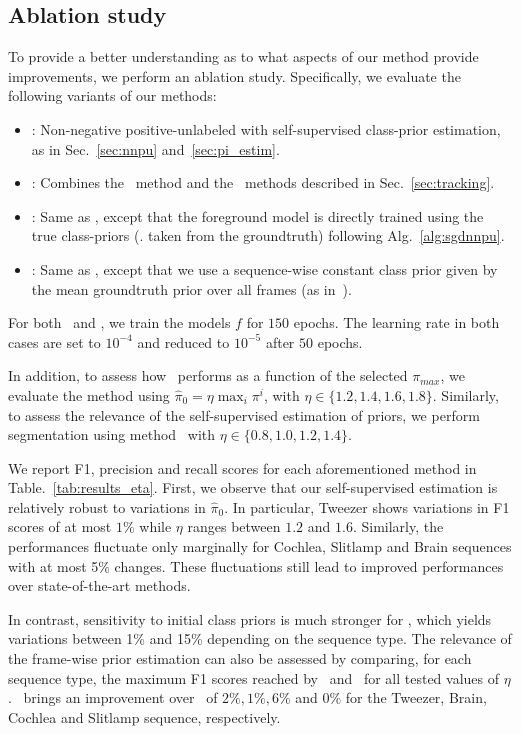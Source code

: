 \subsection{Ablation study}
\label{sec:ablation}
To provide a better understanding as to what aspects of our method provide improvements, we perform an ablation study. Specifically, we evaluate the following variants of our methods:
\begin{itemize}
\item \SSnnPU: Non-negative positive-unlabeled with self-supervised class-prior estimation, as in Sec.~\ref{sec:nnpu} and~\ref{sec:pi_estim}.
\item \SSnnPUKSP: Combines the \SSnnPU~method and the \KSPTrack~methods described in Sec.~\ref{sec:tracking}.
\item \SSnnPUTrue: Same as \SSnnPUKSP, except that the foreground model is directly trained using the true class-priors (\ie. taken from the groundtruth) following Alg.~\ref{alg:sgdnnpu}.
\item \SSnnPUConst: Same as \SSnnPUTrue, except that we use a sequence-wise constant class prior given by the mean groundtruth prior over all frames (as in~\cite{kiryo17}).
\end{itemize}
For both \SSnnPUTrue~and \SSnnPUConst, we train the models $f$ for $150$ epochs. The learning rate in both cases are set to $10^{-4}$ and reduced to $10^{-5}$ after $50$ epochs.



In addition, to assess how \SSnnPUKSP~performs as a function of the selected $\pi_{max}$, we evaluate the method using $\hat \pi_{0}=\eta \max_{i}\pi^{i}$, with $\eta \in \{1.2, 1.4, 1.6, 1.8\}$. Similarly, to assess the relevance of the self-supervised estimation of priors, we perform segmentation using method \SSnnPUConst~with $\eta \in \{0.8, 1.0, 1.2, 1.4\}$.

We report F1, precision and recall scores for each aforementioned method in Table.~\ref{tab:results_eta}. First, we observe that our self-supervised estimation is relatively robust to variations in $\hat \pi_{0}$.
In particular, Tweezer shows variations in F1 scores of at most $1\%$ while $\eta$ ranges between $1.2$ and $1.6$. Similarly, the performances fluctuate only marginally for Cochlea, Slitlamp and Brain sequences with at most 5\% changes. These fluctuations still lead to improved performances over state-of-the-art methods.

In contrast, sensitivity to initial class priors is much stronger for \SSnnPUConst, which yields variations between 1\% and 15\% depending on the sequence type. The relevance of the frame-wise prior estimation can also be assessed by comparing, for each sequence type, the maximum F1 scores reached by \SSnnPUKSP~and \SSnnPUConst~for all tested values of $\eta$. \SSnnPUKSP~brings an improvement over \SSnnPUConst~of $2\%, 1\%, 6\%$ and $0\%$ for the Tweezer, Brain, Cochlea and Slitlamp sequence, respectively.

